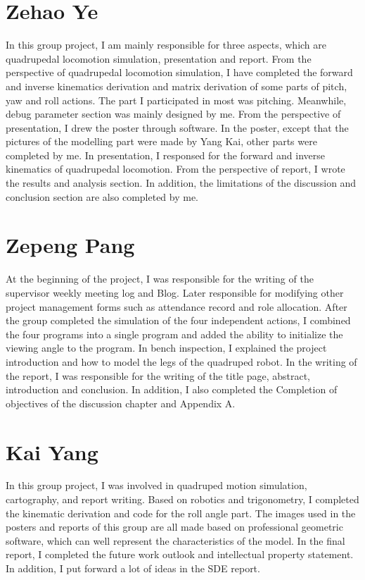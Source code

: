 \section{Zehao Ye}
In this group project, I am mainly responsible for three aspects, which are quadrupedal locomotion simulation, presentation and report. From the perspective of quadrupedal locomotion simulation, I have completed the forward and inverse kinematics derivation and matrix derivation of some parts of pitch, yaw and roll actions. The part I participated in most was pitching. Meanwhile, debug parameter section was mainly designed by me. From the perspective of presentation, I drew the poster through software. In the poster, except that the pictures of the modelling part were made by Yang Kai, other parts were completed by me. In presentation, I responsed for the forward and inverse kinematics of quadrupedal locomotion. From the perspective of report, I wrote the results and analysis section. In addition, the limitations of the discussion and conclusion section are also completed by me.

\section{Zepeng Pang}

At the beginning of the project, I was responsible for the writing of the supervisor weekly meeting log and Blog. Later responsible for modifying other project management forms such as attendance record and role allocation. After the group completed the simulation of the four independent actions, I combined the four programs into a single program and added the ability to initialize the viewing angle to the program. In bench inspection, I explained the project introduction and how to model the legs of the quadruped robot. In the writing of the report, I was responsible for the writing of the title page, abstract, introduction and conclusion. In addition, I also completed the Completion of objectives of the discussion chapter and Appendix A.

\section{Kai Yang}

In this group project, I was involved in quadruped motion simulation, cartography, and report writing. Based on robotics and trigonometry, I completed the kinematic derivation and code for the roll angle part. The images used in the posters and reports of this group are all made based on professional geometric software, which can well represent the characteristics of the model. In the final report, I completed the future work outlook and intellectual property statement. In addition, I put forward a lot of ideas in the SDE report.


